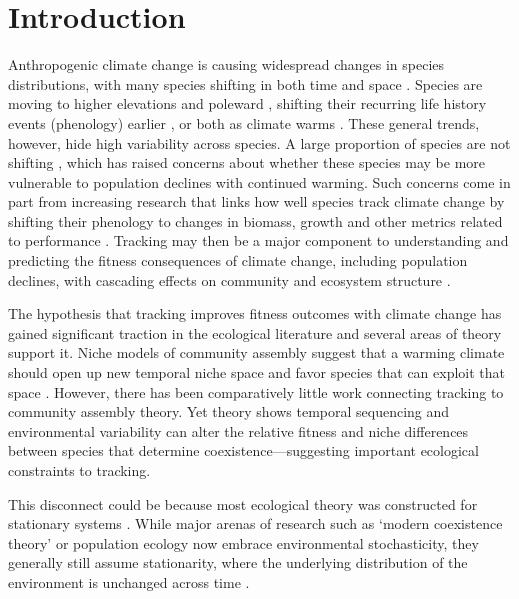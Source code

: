 \documentclass[11pt,letterpaper]{article}
\begin{document}
\section{Introduction}
Anthropogenic climate change is causing widespread changes in species distributions, with many species shifting in both time and space \citep{IPCC:2014sm,ipcc1point5}. Species are moving to higher elevations and poleward \citep{Chen2011}, shifting their recurring life history events (phenology) earlier \citep{Wolkovich:2012n,cohen2018}, or both as climate warms \citep{amano2014,socolar2017}. These general trends, however, hide high variability across species. A large proportion of species are not shifting \citep{Cook:2012pnas,amano2014}, which has raised concerns about whether these species may be more vulnerable to population declines with continued warming. Such concerns come in part from increasing research that links how well species track climate change by shifting their phenology to changes in biomass, growth and other metrics related to performance \citep{Cleland:2012}. Tracking may then be a major component to understanding and predicting the fitness consequences of climate change, including population declines, with cascading effects on community and ecosystem structure \citep{Menzel:2006xn,Parmesan:2006cr}. 

The hypothesis that tracking improves fitness outcomes with climate change has gained significant traction in the ecological literature \citep[e.g.,][]{Cleland:2012} and several areas of theory support it. Niche models of community assembly suggest that a warming climate should open up new temporal niche space and favor species that can exploit that space \citep{gotelli1996,wolkovich:2010fee,Zettlemoyer2019}.  However, there has been comparatively little work connecting tracking to community assembly theory. Yet theory shows temporal sequencing and environmental variability can alter the relative fitness and niche differences between species that determine coexistence---suggesting important ecological constraints to tracking. %

This disconnect could be because most ecological theory was constructed for stationary systems \citep[e.g.,][]{Chesson:1997dz}. While major arenas of research such as `modern coexistence theory' or population ecology now embrace environmental stochasticity, they generally still assume stationarity, where the underlying distribution of the environment is unchanged across time \citep[i.e., constant mean and variance,][]{barabas2018}.
\end{document}
